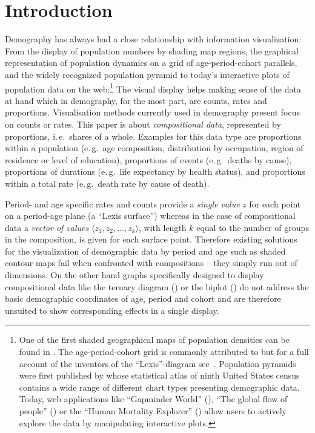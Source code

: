 \documentclass[parskip=half]{scrartcl}
\begin{document}
\section{Introduction} %
\label{sec:intro}

\noindent Demography has always had a close relationship with information visualization: From the display of population numbers by shading map regions, the graphical representation of population dynamics on a grid of age-period-cohort parallels, and the widely recognized population pyramid to today's interactive plots of population data on the web:\footnote{
  One of the first shaded geographical maps of population densities can be found in \textcite{Dangeville1836}. The age-period-cohort grid is commonly attributed to \textcite{Lexis1875} but for a full account of the inventors of the \enquote{Lexis}-diagram see~\textcite{Vandeschrick2001}. Population pyramids were first published by \textcite{Walker1874} whose statistical atlas of ninth United States census contains a wide range of different chart types presenting demographic data. Today, web applications like \enquote{Gapminder World} (\cite{Rosling2006}), \enquote{The global flow of people} (\cite{Abel2014}) or the \enquote{Human Mortality Explorer} (\cite{Schoeley2016}) allow users to actively explore the data by manipulating interactive plots.
}
The visual display helps making sense of the data at hand which in demography, for the most part, are counts, rates and proportions. Visualisation methods currently used in demography present focus on counts or rates. This paper is about \emph{compositional data}, represented by proportions, i.\,e.~shares of a whole. Examples for this data type are proportions within a population (e.\,g.~age composition, distribution by occupation, region of residence or level of education), proportions of events (e.\,g.~deaths by cause), proportions of durations (e.\,g.~life expectancy by health status), and proportions within a total rate (e.\,g.~death rate by cause of death).

Period- and age specific rates and counts provide a \emph{single value} $z$ for each point on a period-age plane (a \enquote{Lexis surface}) whereas in the case of compositional data a \emph{vector of values} $\langle z_1, z_2, \ldots, z_k \rangle$, with length $k$ equal to the number of groups in the composition, is given for each surface point. Therefore existing solutions for the visualization of demographic data by period and age such as shaded contour maps fail when confronted with compositions -- they simply run out of dimensions. On the other hand graphs specifically designed to display compositional data like the ternary diagram (\cite{Aitchison1986}) or the biplot (\cite{Gabriel1971, Aitchison2002}) do not address the basic demographic coordinates of age, period and cohort and are therefore unsuited to show corresponding effects in a single display.
\end{document}
